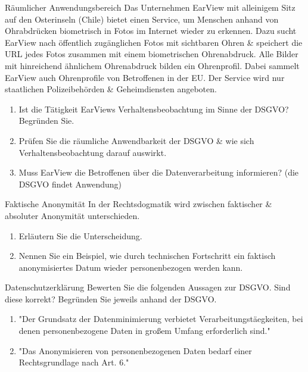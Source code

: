 \documentclass{exercisesheet}
\begin{document}
\begin{exercise*}{Räumlicher Anwendungsbereich}
  Das Unternehmen EarView mit alleinigem Sitz auf den Osterinseln (Chile) bietet einen Service, um Menschen anhand von Ohrabdrücken biometrisch in Fotos im Internet wieder zu erkennen. Dazu sucht EarView nach öffentlich zugänglichen Fotos mit sichtbaren Ohren \& speichert die URL jedes Fotos zusammen mit einem biometrischen Ohrenabdruck. Alle Bilder mit hinreichend ähnlichem Ohrenabdruck bilden ein Ohrenprofil. Dabei sammelt EarView auch Ohrenprofile von Betroffenen in der EU. Der Service wird nur staatlichen Polizeibehörden \& Geheimdiensten angeboten.
  \begin{enumerate}
    \item Ist die Tätigkeit EarViews Verhaltensbeobachtung im Sinne der DSGVO? Begründen Sie.
    \item Prüfen Sie die räumliche Anwendbarkeit der DSGVO \& wie sich Verhaltensbeobachtung darauf auswirkt.
    \item Muss EarView die Betroffenen über die Datenverarbeitung informieren? (die DSGVO findet Anwendung)
  \end{enumerate}
\end{exercise*}

\begin{exercise*}{Faktische Anonymität}
  In der Rechtsdogmatik wird zwischen faktischer \& absoluter Anonymität unterschieden.
  \begin{enumerate}
    \item Erläutern Sie die Unterscheidung.
    \item Nennen Sie ein Beispiel, wie durch technischen Fortschritt ein faktisch anonymisiertes Datum wieder personenbezogen werden kann.
  \end{enumerate}
\end{exercise*}

\begin{exercise*}[2]{Datenschutzerklärung}
  Bewerten Sie die folgenden Aussagen zur DSGVO. Sind diese korrekt? Begründen Sie jeweils anhand der DSGVO.
  \begin{enumerate}
    \item "Der Grundsatz der Datenminimierung verbietet Verarbeitungstäegkeiten, bei denen personenbezogene Daten in großem Umfang erforderlich sind."
    \item "Das Anonymisieren von personenbezogenen Daten bedarf einer Rechtsgrundlage nach Art. 6."
  \end{enumerate}
\end{exercise*}
\end{document}
